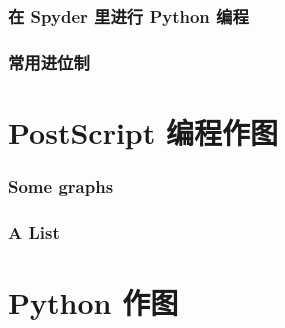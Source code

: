 \documentclass[zihao=-4,heading=true,a4paper,twoside,openany]{ctexbook}
\begin{document}
\section{在 Spyder 里进行 Python 编程}
 \label{chap:2.2}

\section{常用进位制}\label{sec:I.2}



\part{PostScript 编程作图}
\section{Some graphs}


\section{A List}


\part{Python 作图}

%

\printindex
\printbibliography
\end{document}
